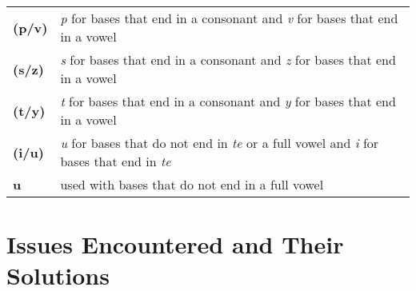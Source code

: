\documentclass{article}
\begin{document}
\begin{tabular}{l l}
\textbf{(p/v)} & \textit{p} for bases that end in a consonant and \textit{v} for bases that end in a vowel \\
\textbf{(s/z)} & \textit{s} for bases that end in a consonant and \textit{z} for bases that end in a vowel \\
\textbf{(t/y)} & \textit{t} for bases that end in a consonant and \textit{y} for bases that end in a vowel \\
\textbf{(i/u)} & \textit{u} for bases that do not end in \textit{te} or a full vowel and \textit{i} for bases that end in \textit{te} \\
\textbf{u} & used with bases that do not end in a full vowel \\

\end{tabular}


\section{Issues Encountered and Their Solutions}
\end{document}
